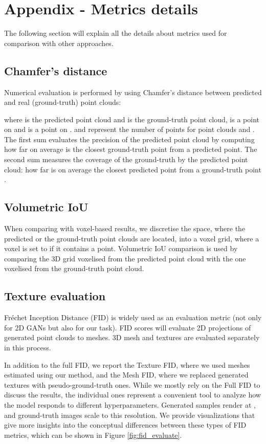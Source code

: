 \documentclass[runningheads]{llncs}
\begin{document}
\section{Appendix - Metrics details}
The following section will explain all the details about metrics used for comparison with other approaches.

\subsection{Chamfer's distance}
Numerical evaluation is performed by using Chamfer's distance \cite{sun2018pix3d} between predicted and real (ground-truth) point clouds:

where  is the predicted point cloud and  is the ground-truth point cloud,  is a point on  and  is a point on .  and  represent the number of points for point clouds  and . The first sum evaluates the precision of the predicted point cloud by computing how far on average is the closest ground-truth point from a predicted point. The second sum measures the coverage of the ground-truth by the predicted point cloud: how far is on average the closest predicted point from a ground-truth point \cite{DBLP:journals/corr/abs-1810-09381}.

\subsection{Volumetric IoU}
When comparing with voxel-based results, we discretise the  space, where the predicted or the ground-truth point clouds are located, into a  voxel grid, where a voxel is set to  if it contains a point. Volumetric IoU \cite{niemeyer2020differentiable} comparison is used by comparing the 3D grid voxelised from the predicted point cloud with the one voxelised from the ground-truth point cloud.

\subsection{Texture evaluation}
Fréchet Inception Distance (FID) is widely used as an evaluation metric \cite{heusel2018gans} (not only for 2D GANs but also for our task). FID scores will evaluate 2D projections of generated point clouds to meshes. 3D mesh and textures are evaluated separately in this process.

In addition to the full FID, we report the Texture FID, where we used meshes estimated using our method, and the Mesh FID, where we replaced generated textures with pseudo-ground-truth ones. While we mostly rely on the Full FID to discuss the results, the individual ones represent a convenient tool to analyze how the model responds to different hyperparameters. Generated samples render at , and ground-truth images scale to this resolution. We provide visualizations that give more insights into the conceptual differences between these types of FID metrics, which can be shown in Figure \ref{fig:fid_evaluate}.
\end{document}
